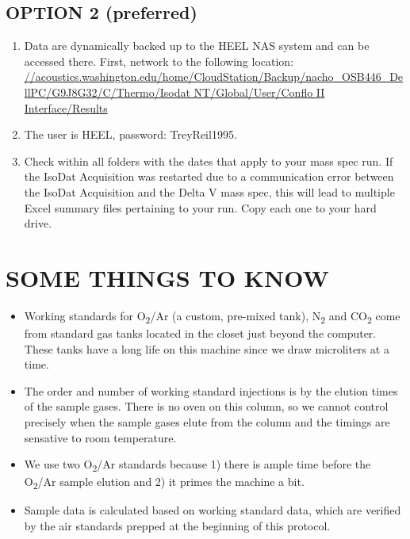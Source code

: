 \documentclass[]{article}
\providecommand{\tightlist}{%
  \setlength{\itemsep}{0pt}\setlength{\parskip}{0pt}}
\begin{document}
\subsection{OPTION 2 (preferred)}\label{option-2-preferred}

\begin{enumerate}
\def\labelenumi{\arabic{enumi}.}
\tightlist
\item
  Data are dynamically backed up to the HEEL NAS system and can be
  accessed there. First, network to the following location:\\
  \href{//acoustics.washington.edu/home/CloudStation/Backup/nacho_OSB446_DellPC/G9J8G32/C/Thermo/Isodat\%20NT/Global/User/Conflo\%20II\%20Interface/Results}{//acoustics.washington.edu/home/CloudStation/Backup/nacho\_OSB446\_DellPC/G9J8G32/C/Thermo/Isodat
  NT/Global/User/Conflo II Interface/Results}
\item
  The user is HEEL, password: TreyReil1995.
\item
  Check within all folders with the dates that apply to your mass spec
  run. If the IsoDat Acquisition was restarted due to a communication
  error between the IsoDat Acquisition and the Delta V mass spec, this
  will lead to multiple Excel summary files pertaining to your run. Copy
  each one to your hard drive.
\end{enumerate}

\section{SOME THINGS TO KNOW}\label{some-things-to-know}

\begin{itemize}
\tightlist
\item
  Working standards for O\textsubscript{2}/Ar (a custom, pre-mixed
  tank), N\textsubscript{2} and CO\textsubscript{2} come from standard
  gas tanks located in the closet just beyond the computer. These tanks
  have a long life on this machine since we draw microliters at a
  time.\\
\item
  The order and number of working standard injections is by the elution
  times of the sample gases. There is no oven on this column, so we
  cannot control precisely when the sample gases elute from the column
  and the timings are sensative to room temperature.\\
\item
  We use two O\textsubscript{2}/Ar standards because 1) there is ample
  time before the O\textsubscript{2}/Ar sample elution and 2) it primes
  the machine a bit.\\
\item
  Sample data is calculated based on working standard data, which are
  verified by the air standards prepped at the beginning of this
  protocol.
\end{itemize}
\end{document}
